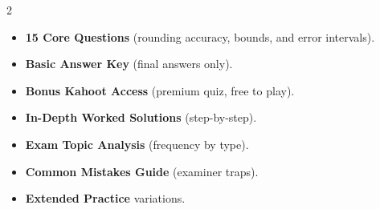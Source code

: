 \documentclass[11pt,a4paper]{article}
\newcommand{\FullReleaseDate}{April 30, 2026}
\begin{document}
\vspace{8pt}

\begin{multicols}{2}
  \begin{tcolorbox}[card, title=\sffamily\bfseries\textcolor{white}{\faHandPointDown\ TODAY (Simplified Version)}, colbacktitle=mainblue, boxed title style={sharp corners, boxrule=0pt}]
    \begin{itemize}[leftmargin=1.2em, itemsep=2pt]
      \item \small \textbf{15 Core Questions} (rounding accuracy, bounds, and error intervals).
      \item \small \textbf{Basic Answer Key} (final answers only).
      \item \small \textbf{Bonus Kahoot Access} (premium quiz, free to play).
    \end{itemize}
  \end{tcolorbox}

  \columnbreak

  \begin{tcolorbox}[card, title=\sffamily\bfseries\textcolor{white}{\faRocket\ ON \FullReleaseDate\ (Full Upgrade)}, colbacktitle=mainblue, boxed title style={sharp corners, boxrule=0pt}]
    \begin{itemize}[leftmargin=1.2em, itemsep=2pt]
      \item \small \textbf{In-Depth Worked Solutions} (step-by-step).
      \item \small \textbf{Exam Topic Analysis} (frequency by type).
      \item \small \textbf{Common Mistakes Guide} (examiner traps).
      \item \small \textbf{Extended Practice} variations.
    \end{itemize}
  \end{tcolorbox}
\end{multicols}
\end{document}
